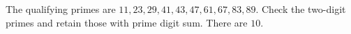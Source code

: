 The qualifying primes are $11,23,29,41,43,47,61,67,83,89$. Check the two-digit primes and retain those with prime digit sum. There are $\boxed{10}$.
